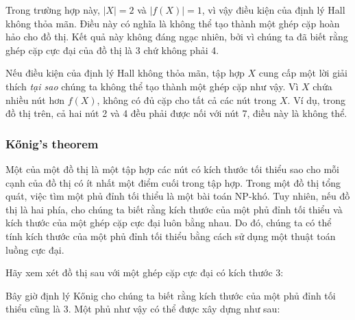 Trong trường hợp này, $|X|=2$ và $|f(X)|=1$,
vì vậy điều kiện của định lý Hall không thỏa mãn.
Điều này có nghĩa là không thể tạo thành
một ghép cặp hoàn hảo cho đồ thị.
Kết quả này không đáng ngạc nhiên, bởi vì chúng ta đã
biết rằng ghép cặp cực đại của đồ thị là 3 chứ không phải 4.

Nếu điều kiện của định lý Hall không thỏa mãn,
tập hợp $X$ cung cấp một lời giải thích \emph{tại sao}
chúng ta không thể tạo thành một ghép cặp như vậy.
Vì $X$ chứa nhiều nút hơn $f(X)$,
không có đủ cặp cho tất cả các nút trong $X$.
Ví dụ, trong đồ thị trên, cả hai nút 2 và 4
đều phải được nối với nút 7, điều này là không thể.

\subsubsection{Kőnig's theorem}


Một  của một đồ thị
là một tập hợp các nút có kích thước tối thiểu sao cho mỗi cạnh của đồ thị
có ít nhất một điểm cuối trong tập hợp.
Trong một đồ thị tổng quát, việc tìm một phủ đỉnh tối thiểu
là một bài toán NP-khó.
Tuy nhiên, nếu đồ thị là hai phía,
 cho chúng ta biết rằng
kích thước của một phủ đỉnh tối thiểu
và kích thước của một ghép cặp cực đại luôn bằng nhau.
Do đó, chúng ta có thể tính kích thước của một phủ đỉnh tối thiểu
bằng cách sử dụng một thuật toán luồng cực đại.

Hãy xem xét đồ thị sau
với một ghép cặp cực đại có kích thước 3:
\begin{center}
\end{center}
Bây giờ định lý Kőnig cho chúng ta biết rằng kích thước
của một phủ đỉnh tối thiểu cũng là 3.
Một phủ như vậy có thể được xây dựng như sau:

